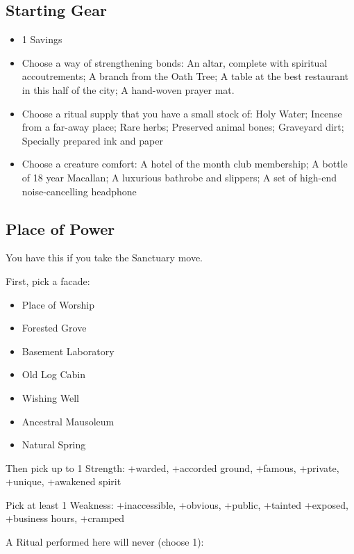 \documentclass[
  oneside,
  statementpaper,
  9pt]{memoir}
\begin{document}
\hypertarget{starting-gear-4}{%
\subsection{Starting Gear}\label{starting-gear-4}}

\begin{itemize}
\tightlist
\item
  1 Savings
\item
  Choose a way of strengthening bonds: An altar, complete with spiritual
  accoutrements; A branch from the Oath Tree; A table at the best
  restaurant in this half of the city; A hand-woven prayer mat.
\item
  Choose a ritual supply that you have a small stock of: Holy Water;
  Incense from a far-away place; Rare herbs; Preserved animal bones;
  Graveyard dirt; Specially prepared ink and paper
\item
  Choose a creature comfort: A hotel of the month club membership; A
  bottle of 18 year Macallan; A luxurious bathrobe and slippers; A set
  of high-end noise-cancelling headphone
\end{itemize}

\hypertarget{place-of-power-2}{%
\subsection{Place of Power}\label{place-of-power-2}}

You have this if you take the Sanctuary move.

First, pick a facade:

\begin{itemize}
\tightlist
\item
  Place of Worship
\item
  Forested Grove
\item
  Basement Laboratory
\item
  Old Log Cabin
\item
  Wishing Well
\item
  Ancestral Mausoleum
\item
  Natural Spring
\end{itemize}

Then pick up to 1 Strength: +warded, +accorded ground, +famous,
+private, +unique, +awakened spirit

Pick at least 1 Weakness: +inaccessible, +obvious, +public, +tainted
+exposed, +business hours, +cramped

A Ritual performed here will never (choose 1):
\end{document}
